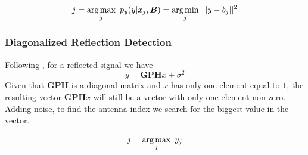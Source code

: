 \begin{equation}
  j = \operatorname*{arg\,max}_j\ p_y (y | x_j, \bm{B}) = \operatorname*{arg\,min}_j\ || y - b_j ||^2
  \label{eq:direct_detection}
\end{equation}

\subsubsection{Diagonalized Reflection Detection}
Following \cite{9328149}, for a reflected signal we have
\begin{equation}
  y = \bm{GPH}x + \sigma^2
\end{equation}
Given that $\bm{GPH}$ is a diagonal matrix and $x$ has only one element equal to $1$, the resulting vector $\bm{GPH}x$ will still be a vector with only one element non zero. Adding noise, to find the antenna index we search for the biggest value in the vector.

\begin{equation}
  j = \operatorname*{arg\,max}_j\ y_j
  \label{eq:reflection_detection}
\end{equation}